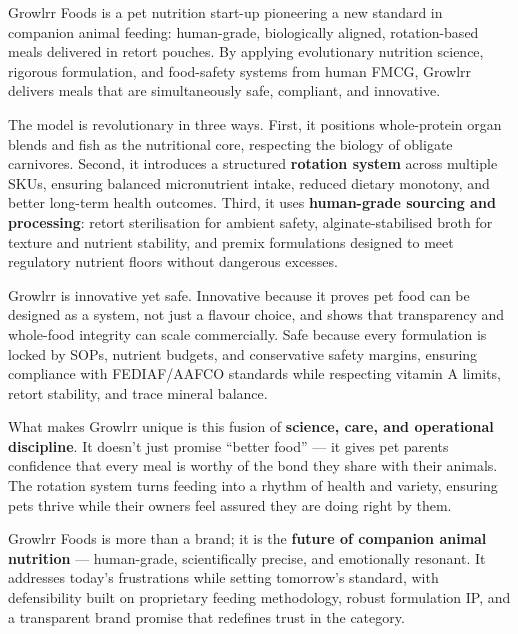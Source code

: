
Growlrr Foods is a pet nutrition start-up pioneering a new standard in companion animal feeding: human-grade, biologically aligned, rotation-based meals delivered in retort pouches. By applying evolutionary nutrition science, rigorous formulation, and food-safety systems from human FMCG, Growlrr delivers meals that are simultaneously safe, compliant, and innovative.

The model is revolutionary in three ways. First, it positions whole-protein organ blends and fish as the nutritional core, respecting the biology of obligate carnivores. Second, it introduces a structured \textbf{rotation system} across multiple SKUs, ensuring balanced micronutrient intake, reduced dietary monotony, and better long-term health outcomes. Third, it uses \textbf{human-grade sourcing and processing}: retort sterilisation for ambient safety, alginate-stabilised broth for texture and nutrient stability, and premix formulations designed to meet regulatory nutrient floors without dangerous excesses.

Growlrr is innovative yet safe. Innovative because it proves pet food can be designed as a system, not just a flavour choice, and shows that transparency and whole-food integrity can scale commercially. Safe because every formulation is locked by SOPs, nutrient budgets, and conservative safety margins, ensuring compliance with FEDIAF/AAFCO standards while respecting vitamin A limits, retort stability, and trace mineral balance.

What makes Growlrr unique is this fusion of \textbf{science, care, and operational discipline}. It doesn't just promise ``better food'' --- it gives pet parents confidence that every meal is worthy of the bond they share with their animals. The rotation system turns feeding into a rhythm of health and variety, ensuring pets thrive while their owners feel assured they are doing right by them.

Growlrr Foods is more than a brand; it is the \textbf{future of companion animal nutrition} --- human-grade, scientifically precise, and emotionally resonant. It addresses today's frustrations while setting tomorrow's standard, with defensibility built on proprietary feeding methodology, robust formulation IP, and a transparent brand promise that redefines trust in the category.